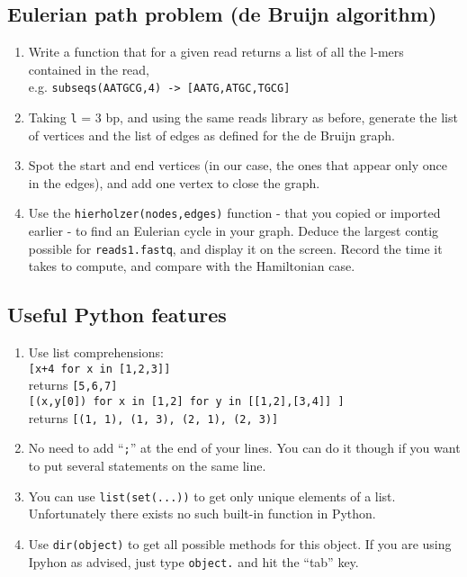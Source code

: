 \documentclass[a4paper,11pt]{article}
\begin{document}
\subsection{Eulerian path problem (de Bruijn algorithm)}
\begin{enumerate}
\item Write a function that for a given read returns a list of all the l-mers contained in the read, \\
e.g. \texttt{subseqs(AATGCG,4) ->  [AATG,ATGC,TGCG]}
\item Taking \texttt{l} = 3 bp, and using the same reads library as before, generate the list of vertices and the list of edges as defined for the de Bruijn graph.
\item Spot the start and end vertices (in our case, the ones that appear only once in the edges), and add one vertex to close the graph.
\item Use the \texttt{hierholzer(nodes,edges)} function - that you copied or imported earlier - to find an Eulerian cycle in your graph. Deduce the largest contig possible for \texttt{reads1.fastq}, and display it on the screen. Record the time it takes to compute, and compare with the Hamiltonian case.
\end{enumerate}

\subsection{Useful Python features}
\begin{enumerate}
\item Use list comprehensions:\\
\texttt{[x+4 for x in [1,2,3]]} \\
returns \texttt{[5,6,7]} \\
\texttt{[(x,y[0]) for x in [1,2] for y in [[1,2],[3,4]] ]}\\
returns \texttt{[(1, 1), (1, 3), (2, 1), (2, 3)]}
\item No need to add ``\texttt{;}'' at the end of your lines. You can do it though if you want to put several statements on the same line.
\item You can use \texttt{list(set(...))} to get only unique elements of a list. Unfortunately there exists no such built-in function in Python.
\item Use \texttt{dir(object)} to get all possible methods for this object. If you are using Ipyhon as advised, just type \texttt{object.} and hit the ``tab'' key.
\end{enumerate}
\end{document}
